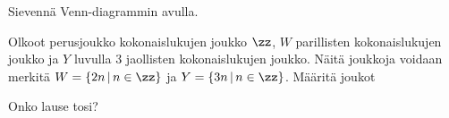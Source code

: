 \begin{tehtava}
     Sievennä Venn-diagrammin avulla.
    \begin{alakohdat}
    \end{alakohdat}

    \begin{vastaus}
    
        \begin{alakohdat}
        \end{alakohdat}
    \end{vastaus}
    
\end{tehtava}

\begin{tehtava}
  Olkoot perusjoukko kokonaislukujen joukko $\zz$, $W$ parillisten kokonaislukujen joukko ja $Y$ luvulla $3$ jaollisten kokonaislukujen joukko. Näitä joukkoja voidaan merkitä $W = \{2n\,|\, n\in\zz\}$ ja $Y = \{3n \,|\, n \in \zz\}$. Määritä joukot   
    \begin{alakohdat}
    \end{alakohdat}

    \begin{vastaus}
    
        \begin{alakohdat}
        \end{alakohdat}
    \end{vastaus}
    
\end{tehtava}

\begin{tehtava}
     Onko lause tosi?
    \begin{alakohdat}
        \alakohta{$-3 \in \nn$}
        \alakohta{$\pi \in \rr \setminus \qq$}
        \alakohta{$\emptyset \subset \zz$}
    \end{alakohdat}

    \begin{vastaus}
    
        \begin{alakohdat}
        \end{alakohdat}
    \end{vastaus}
    
\end{tehtava}

